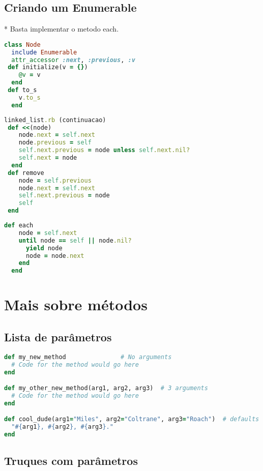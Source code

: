 \documentclass[serif,mathserif]{article}
\begin{document}
\subsection{Criando um Enumerable}
  *  Basta implementar o metodo each. 
\begin{lstlisting}[language=ruby]
class Node
  include Enumerable 
  attr_accessor :next, :previous, :v
 def initialize(v = {})
    @v = v
  end
 def to_s
    v.to_s
  end
\end{lstlisting}

\begin{lstlisting}[language=ruby]
linked_list.rb (continuacao)
 def <<(node)
    node.next = self.next
    node.previous = self
    self.next.previous = node unless self.next.nil?
    self.next = node
  end
 def remove
    node = self.previous
    node.next = self.next
    self.next.previous = node
    self
 end
\end{lstlisting}

\begin{lstlisting}[language=ruby]
  def each
    node = self.next
    until node == self || node.nil?
      yield node
      node = node.next
    end
  end

\end{lstlisting}



\section{Mais sobre métodos}

\subsection{Lista de parâmetros}

\begin{lstlisting}[language=ruby]
def my_new_method               # No arguments
  # Code for the method would go here
end

def my_other_new_method(arg1, arg2, arg3)  # 3 arguments
  # Code for the method would go here
end

def cool_dude(arg1="Miles", arg2="Coltrane", arg3="Roach")  # defaults
  "#{arg1}, #{arg2}, #{arg3}."
end
\end{lstlisting}

\subsection{Truques com parâmetros}
\end{document}
